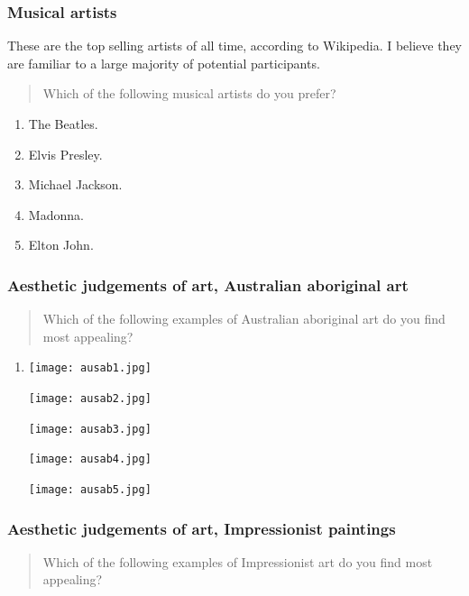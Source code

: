 \documentclass[11pt,letter]{amsart}
\begin{document}
\subsubsection{Musical artists}

These are the top selling artists of all time, according to Wikipedia.
I believe they are familiar to a large majority of potential participants.

\begin{quotation}
	Which of the following musical artists do you prefer?
\end{quotation}

\begin{enumerate}
	\item The Beatles.
	
	\item Elvis Presley.

	\item Michael Jackson.

	\item Madonna.

	\item Elton John.
\end{enumerate}

\subsubsection{Aesthetic judgements of art, Australian aboriginal art}

\begin{quotation}
Which of the following examples of Australian aboriginal art do you find
most appealing?
\end{quotation}

\begin{enumerate}
\item \texttt{[image: ausab1.jpg]}

\texttt{[image: ausab2.jpg]}

\texttt{[image: ausab3.jpg]}

\texttt{[image: ausab4.jpg]}

\texttt{[image: ausab5.jpg]}
\end{enumerate}

\subsubsection{Aesthetic judgements of art, Impressionist paintings}

\begin{quotation}
Which of the following examples of Impressionist art do you find most appealing?
\end{quotation}
\end{document}
